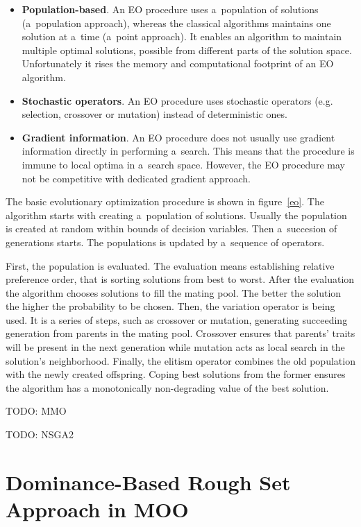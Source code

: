 \begin{itemize}
\item \textbf{Population-based}. An EO procedure uses a~population of
  solutions (a~population approach), whereas the classical algorithms
  maintains one solution at a~time (a~point approach). It enables an algorithm
  to maintain multiple optimal solutions, possible from different parts of the
  solution space. Unfortunately it rises the memory and computational
  footprint of an EO algorithm.
\item \textbf{Stochastic operators}. An EO procedure uses stochastic operators
  (e.g. selection, crossover or mutation) instead of deterministic ones.
\item \textbf{Gradient information}. An EO procedure does not usually use
  gradient information directly in performing a~search. This means that the
  procedure is immune to local optima in a~search space. However, the EO
  procedure may not be competitive with dedicated gradient approach.
\end{itemize}

The basic evolutionary optimization procedure is shown in figure~\ref{eo}. The
algorithm starts with creating a~population of solutions. Usually the
population is created at random within bounds of decision variables. Then
a~succesion of generations starts. The populations is updated by a~sequence of
operators.

First, the population is evaluated. The evaluation means establishing relative
preference order, that is sorting solutions from best to worst. After the
evaluation the algorithm chooses solutions to fill the mating pool. The better
the solution the higher the probability to be chosen. Then, the variation
operator is being used. It is a series of steps, such as crossover or
mutation, generating succeeding generation from parents in the mating
pool. Crossover ensures that parents' traits will be present in the next
generation while mutation acts as local search in the solution's
neighborhood. Finally, the elitism operator combines the old population with
the newly created offspring. Coping best solutions from the former ensures the
algorithm has a monotonically non-degrading value of the best solution.


TODO: MMO

TODO: NSGA2


\section{Dominance-Based Rough Set Approach in MOO}
\label{sec_drsa_in_moo}


